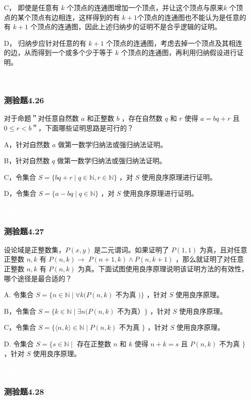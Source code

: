 \documentclass[UTF8, heading=true]{ctexart}
\begin{document}
C，
即使是任意有 $k$ 个顶点的连通图增加一个顶点，并让这个顶点与原来$k$ 个顶点的某个顶点有边相连，这样得到的有 $k+1$个顶点的连通图也不能认为是任意的有 $k+1$ 个顶点的连通图，因此上述归纳步的证明不是合乎逻辑的证明。

D，
归纳步应针对任意的有 $k+1$ 个顶点的连通图，考虑去掉一个顶点及其相连的边，从而得到一个或多个少于等于 $k$ 个顶点的连通图，再利用归纳假设进行证明。


\textcolor{white}{答案：BCD}

\subsubsection{测验题4.26}

对于命题＂对任意自然数 $a$ 和正整数 $b$ ，存在自然数 $q$ 和 $r$ 使得 $a=b q+r$ 且 $0 \leq r<b$＂，下面哪些证明思路是可行的？

A，针对自然数 $a$ 做第一数学归纳法或强归纳法证明。

B，针对自然数 $q$ 做第一数学归纳法或强归纳法证明。

C，令集合 $S=\{b q+r \mid q \in \mathbb{N}, r \in \mathbb{N}\}$ ，对 $S$ 使用良序原理进行证明。

D，令集合 $S=\{a-b q \mid q \in \mathbb{N}\}$ ，对 $S$ 使用良序原理进行证明。


\textcolor{white}{答案：A}

\subsubsection{测验题4.27}

设论域是正整数集，$P(x, y)$ 是二元谓词。如果证明了 $P(1,1)$ 为真，且对任意正整数 $n, k$ 有 $P(n, k) \rightarrow$ $P(n+1, k) \wedge P(n, k+1)$ ，那么就证明了对任意正整数 $n, k$ 有 $P(n, k)$ 为真。下面试图使用良序原理说明该证明方法的有效性，哪个途径是最合适的？

A. 令集合 $S=\{n \in \mathbb{N} \mid \forall k(P(n, k)$ 不为真 $)\}$ ，针对 $S$ 使用良序原理。

B，令集合 $S=\{k \in \mathbb{N} \mid \exists n(P(n, k)$ 不为真）$\}$ ，针对 $S$ 使用良序原理。

C，令集合 $S=\{\langle n, k\rangle \in \mathbb{N} \mid P(n, k)$ 不为真 $\}$ ，针对 $S$ 使用良序原理。

D. 令集合 $S=\{s \in \mathbb{N} \mid$ 存在正整数 $n$ 和 $k$ 使得 $n+k=s$ 且 $P(n, k)$ 不为真 $\}$ ，针对 $S$ 使用良序原理。

\textcolor{white}{答案：D}

\subsubsection{测验题4.28}
\end{document}
